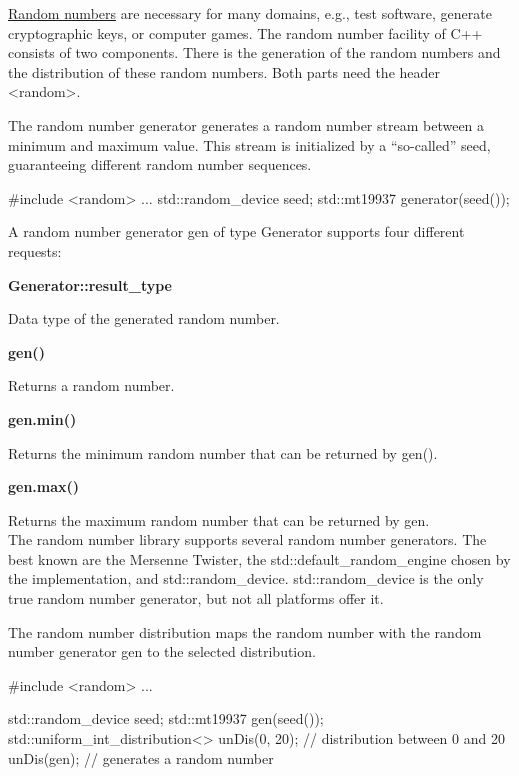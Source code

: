 \href{http://en.cppreference.com/w/cpp/header/random}{Random numbers} are necessary for many domains, e.g., test software, generate cryptographic keys, or computer games. The random number facility of C++ consists of two components. There is the generation of the random numbers and the distribution of these random numbers. Both parts need the header <random>.


The random number generator generates a random number stream between a minimum and maximum value. This stream is initialized by a “so-called” seed, guaranteeing different random number sequences.

\begin{cpp}
#include <random>
...
std::random_device seed;
std::mt19937 generator(seed());
\end{cpp}

A random number generator gen of type Generator supports four different requests:

\noindent
\textbf{Generator::result\_type}

Data type of the generated random number.

\noindent
\textbf{gen()}

Returns a random number.

\noindent
\textbf{gen.min()}

Returns the minimum random number that can be returned by gen().

\noindent
\textbf{gen.max()}

Returns the maximum random number that can be returned by gen. \\

The random number library supports several random number generators. The best known are the Mersenne Twister, the std::default\_random\_engine chosen by the implementation, and std::random\_device. std::random\_device is the only true random number generator, but not all platforms offer it.


The random number distribution maps the random number with the random number generator gen to the selected distribution.

\begin{cpp}
#include <random>
...

std::random_device seed;
std::mt19937 gen(seed());
std::uniform_int_distribution<> unDis(0, 20); // distribution between 0 and 20
unDis(gen); // generates a random number
\end{cpp}

